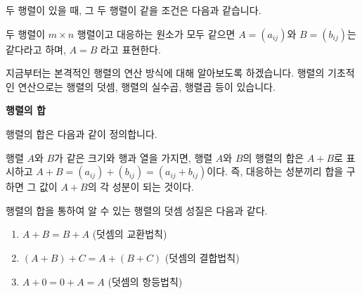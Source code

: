 \begin{flushleft}
    두 행렬이 있을 때, 그 두 행렬이 같을 조건은 다음과 같습니다.
\end{flushleft}

\begin{tcolorbox}[colback = white, colframe = Definition, title = \textmd{정의: 두 행렬의 같음}]
    두 행렬이 $m \times n$ 행렬이고 대응하는 원소가 모두 같으면 $A = (a_{ij})$와 $B = (b_{ij})$는 같다라고 하며, $A = B$ 라고 표현한다.
\end{tcolorbox}

\newpage

\begin{flushleft}
    지금부터는 본격적인 행렬의 연산 방식에 대해 알아보도록 하겠습니다. 행렬의 기초적인 연산으로는 행렬의 덧셈, 행렬의 실수곱, 행렬곱 등이 있습니다.
\end{flushleft}

\bigskip
\begin{flushleft}
    {\textcolor{subheader}{{\LARGE\textbf{행렬의 합}}}}
\end{flushleft}

\begin{flushleft}
    행렬의 합은 다음과 같이 정의합니다.
\end{flushleft}

\begin{tcolorbox}[colback = white, colframe = Definition, title = \textmd{정의: 행렬의 합}]
    행렬 $A$와 $B$가 같은 크기와 행과 열을 가지면, 행렬 $A$와 $B$의 행렬의 합은 $A + B$로 표시하고 $A + B = (a_{ij}) + (b_{ij}) = (a_{ij}+b_{ij})$이다. 즉, 대응하는 성분끼리 합을 구하면 그 값이 $A + B$의 각 성분이 되는 것이다.
\end{tcolorbox}

\begin{flushleft}
    행렬의 합을 통하여 알 수 있는 행렬의 덧셈 성질은 다음과 같다.
\end{flushleft}

\begin{tcolorbox}[colback = white, colframe = Theorem, title = \textmd{정리: 행렬의 덧셈 성질}]
    \begin{enumerate}
        \item $A + B = B + A$    (덧셈의 교환법칙)
        \item $(A + B) + C = A + (B + C)$    (덧셈의 결합법칙)
        \item $A + 0 = 0 + A = A$    (덧셈의 항등법칙)
    \end{enumerate}
\end{tcolorbox}

